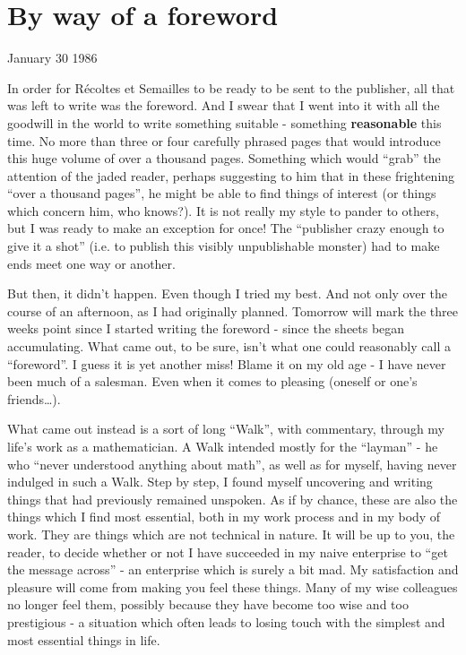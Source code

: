 \begin{comment}
\documentclass{book}
\usepackage{master}
\newcommand{\rec}{$\text{R\'ecoltes et Semailles}$}
\newcommand{\no}{n$^\circ$}
\hfuzz = 100pt

\end{comment}

\chapter{By way of a foreword}
\label{chapter:1}

January 30 1986

In order for R\'ecoltes et Semailles to be ready to be sent to the publisher, all that was left to write was the foreword.
And I swear that I went into it with all the goodwill in the world to write something suitable - something \textbf{reasonable} this time. No more than three or four carefully phrased pages that would introduce this huge volume of over a thousand
pages. Something which  would ``grab'' the attention of the jaded reader, 
perhaps suggesting to him that in these frightening ``over a thousand pages'', he might be able to find
things of interest (or things which concern him, who knows?). It is not
really my style to pander to others, but I was ready to make an exception for once!
The ``publisher crazy enough to give it a shot'' (i.e. to publish this visibly unpublishable
monster) had to make ends meet one way or another. 

But then, it didn't happen. Even though I tried my best. And not only over the course of an afternoon, as I had
originally planned. Tomorrow will mark the three weeks point since I started writing the foreword - since the sheets began
accumulating.
What came out, to be sure, isn't what one could reasonably call a ``foreword''.
I guess it is yet another miss! Blame it on my old age - I have never been much of a salesman. Even when
it comes to pleasing (oneself or one's friends\ldots).

What came out instead is a sort of long ``Walk'', with commentary, through my life's work as a mathematician. 
A Walk intended mostly for the ``layman'' - he who ``never understood anything about
math'', as well as for myself, having never indulged in such a Walk. 
Step by step, I found myself uncovering and writing things that had previously remained
unspoken. As if by chance, these are also the things which I find most essential, both in
my work process and in my body of work. 
They are things which are not technical in nature. It will be up to you, the reader, to decide whether
or not I have succeeded in my naive enterprise to ``get the message across'' - an enterprise
which is surely a bit mad. 
My satisfaction and pleasure will come from making you feel these things. Many of my wise colleagues no longer feel them, 
possibly because they have become too wise
and too prestigious - a situation which often leads to losing touch with the simplest and most essential things in life. 

